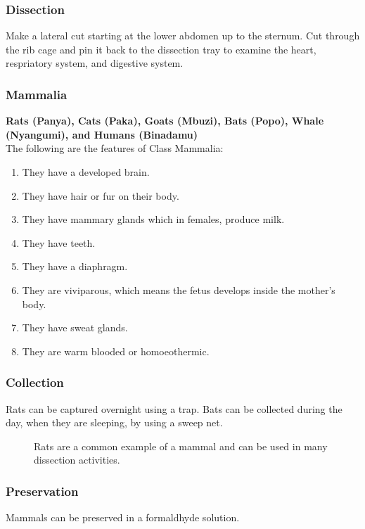 \subsubsection{Dissection}
Make a lateral cut starting at the lower abdomen up to the sternum. Cut through the rib cage and pin it back to the dissection tray to examine the heart, respriatory system, and digestive system.

\subsubsection{Mammalia} 
\textbf{Rats (Panya), Cats (Paka), Goats (Mbuzi), Bats (Popo), Whale (Nyangumi), and Humans (Binadamu)}\\
The following are the features of Class Mammalia:
\begin{enumerate}
\item{They have a developed brain.}
\item{They have hair or fur on their body.}
\item{They have mammary glands which in females, produce milk.}
\item{They have teeth.}
\item{They have a diaphragm.}
\item{They are viviparous, which means the fetus develops inside the mother’s body.}
\item{They have sweat glands.}
\item{They are warm blooded or homoeothermic.}
\end{enumerate}

\subsubsection{Collection}
Rats can be captured overnight using a trap. Bats can be collected during the day, when they are sleeping, by using a sweep net.

\begin{figure}[h]
\begin{center}
\def\svgwidth{6cm}

\caption{Rats are a common example of a mammal and can be used in many dissection activities.}
\label{fig:rat}
\end{center}
\end{figure}

\subsubsection{Preservation} 
Mammals can be preserved in a formaldhyde solution.

